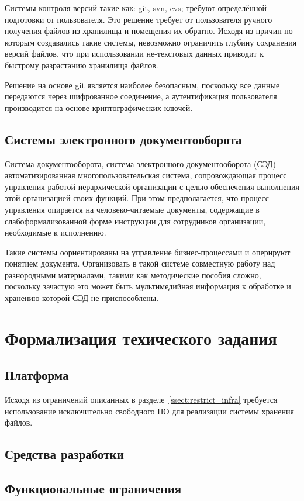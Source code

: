 \documentclass[utf8,usehyperref,12pt]{G7-32}
\begin{document}
Системы контроля версий такие как: git, svn, cvs; требуют определённой подготовки от пользователя. Это решение требует от пользователя ручного получения файлов из хранилища и помещения их обратно. Исходя из причин по которым создавались такие системы, невозможно ограничить глубину сохранения версий файлов, что при использовании не-текстовых данных приводит к быстрому разрастанию хранилища файлов.

Решение на основе git является наиболее безопасным, поскольку все данные передаются через шифрованное соединение, а аутентификация пользователя производится на основе криптографических ключей.

\subsection{Системы электронного документооборота}
Система документооборота, система электронного документооборота (СЭД) — автоматизированная многопользовательская система, сопровождающая процесс управления работой иерархической организации с целью обеспечения выполнения этой организацией своих функций. При этом предполагается, что процесс управления опирается на человеко-читаемые документы, содержащие в слабоформализованной форме инструкции для сотрудников организации, необходимые к исполнению.

Такие системы оориентированы на управление бизнес-процессами и оперируют понятием документа. Организовать в такой системе совместную работу над разнородными материалами, такими как методические пособия сложно, поскольку зачастую это может быть мультимедийная информация к обработке и хранению которой СЭД не приспособлены.

\section{Формализация техического задания}
\subsection{Платформа}
Исходя из ограничений описанных в разделе~\ref{ssect:restrict_infra} требуется использование исключительно свободного ПО для реализации системы хранения файлов. 
\subsection{Средства разработки}

\subsection{Функциональные ограничения}
\end{document}
